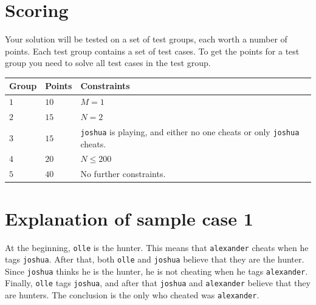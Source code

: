 \section*{Scoring}
Your solution will be tested on a set of test groups, each worth a number of points. Each test group contains
a set of test cases. To get the points for a test group you need to solve all test cases in the test group.


\noindent
\begin{tabular}{| l | l | p{12cm} |}
  \hline
  \textbf{Group} & \textbf{Points} & \textbf{Constraints} \\ \hline
  $1$    & $10$       & $M = 1$ \\ \hline
  $2$    & $15$       & $N = 2$ \\ \hline
  $3$    & $15$       & \texttt{joshua} is playing, and either no one cheats or only \texttt{joshua} cheats. \\ \hline
  $4$    & $20$       & $N \leq 200$ \\ \hline
  $5$    & $40$       & No further constraints. \\ \hline
\end{tabular}


\section*{Explanation of sample case 1}
At the beginning, \texttt{olle} is the hunter.
This means that \texttt{alexander} cheats when he tags \texttt{joshua}.
After that, both \texttt{olle} and \texttt{joshua} believe that they are the hunter.
Since \texttt{joshua} thinks he is the hunter, he is not cheating when he tags \texttt{alexander}.
Finally, \texttt{olle} tags \texttt{joshua}, and after that \texttt{joshua} and \texttt{alexander} believe that they are hunters.
The conclusion is the only who cheated was \texttt{alexander}.
